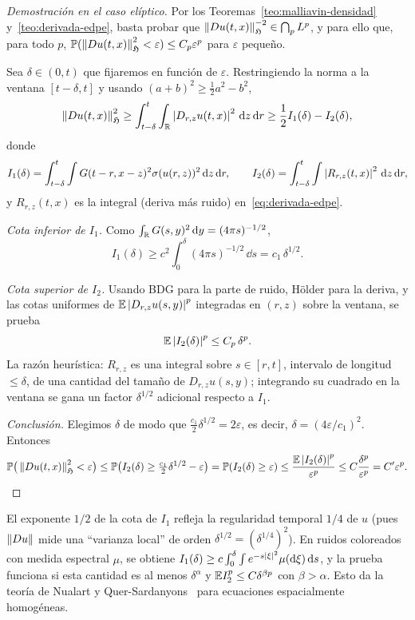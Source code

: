 \begin{proof}[Demostración en el caso elíptico]
Por los Teoremas~\ref{teo:malliavin-densidad} y~\ref{teo:derivada-edpe}, basta probar que
$\left\lVert Du(t,x)\right\rVert^{-2}_{\mathfrak{H}}\in\bigcap_pL^p$, y para ello que, para todo $p$, $\mathbb{P}(\left\lVert Du(t,x)\right\rVert^2_{\mathfrak{H}}<\varepsilon)\le C_p\varepsilon^p$ para $\varepsilon$
pequeño.

Sea $\delta\in(0,t)$ que fijaremos en función de $\varepsilon$. Restringiendo la norma a la ventana $[t-\delta,t]$ y
usando $(a+b)^2\ge\frac12a^2-b^2$,
\[
  \left\lVert Du(t,x)\right\rVert^2_{\mathfrak{H}}\ge\int_{t-\delta}^t\int_{\mathbb{R}}\left\lvert D_{r,z}u(t,x)\right\rvert^2\,\mathrm{d} z\,\mathrm{d} r\ge\frac12I_1(\delta)-I_2(\delta),
\]
donde
\[
  I_1(\delta)=\int_{t-\delta}^t\int G(t-r,x-z)^2\sigma(u(r,z))^2\,\mathrm{d} z\,\mathrm{d} r,\qquad I_2(\delta)=\int_{t-\delta}^t\int\left\lvert R_{r,z}(t,x)\right\rvert^2\,\mathrm{d} z\,\mathrm{d} r,
\]
y $R_{r,z}(t,x)$ es la integral (deriva más ruido) en~\eqref{eq:derivada-edpe}.

\emph{Cota inferior de $I_1$.} Como $\int_{\mathbb{R}} G(s,y)^2\,\mathrm{d} y=(4\pi s)^{-1/2}$,
\[
  I_1(\delta)\ge c^2\int_0^\delta(4\pi s)^{-1/2}\,\dd s=c_1\,\delta^{1/2}.
\]

\emph{Cota superior de $I_2$.} Usando BDG para la parte de ruido, Hölder para la deriva, y las cotas
uniformes de $\mathbb{E}\left\lvert D_{r,z}u(s,y)\right\rvert^p$ integradas en $(r,z)$ sobre la ventana, se prueba
\[
  \mathbb{E}\left\lvert I_2(\delta)\right\rvert^p\le C_p\,\delta^p.
\]
La razón heurística: $R_{r,z}$ es una integral sobre $s\in[r,t]$, intervalo de longitud $\le\delta$, de una
cantidad del tamaño de $D_{r,z}u(s,y)$; integrando su cuadrado en la ventana se gana un factor
$\delta^{1/2}$ adicional respecto a $I_1$.

\emph{Conclusión.} Elegimos $\delta$ de modo que $\frac{c_1}{2}\delta^{1/2}=2\varepsilon$, es decir, $\delta=(4\varepsilon/c_1)^2$. Entonces
\[
  \mathbb{P}\big(\left\lVert Du(t,x)\right\rVert^2_{\mathfrak{H}}<\varepsilon\big)\le\mathbb{P}\big(I_2(\delta)\ge\tfrac{c_1}{2}\delta^{1/2}-\varepsilon\big)=\mathbb{P}(I_2(\delta)\ge\varepsilon)\le\frac{\mathbb{E}\left\lvert I_2(\delta)\right\rvert^p}{\varepsilon^p}\le C\frac{\delta^p}{\varepsilon^p}=C'\varepsilon^p.
  \qedhere
\]
\end{proof}

\begin{observacion}
El exponente $1/2$ de la cota de $I_1$ refleja la regularidad temporal $1/4$ de $u$
(pues $\left\lVert Du\right\rVert$ mide una ``varianza local'' de orden $\delta^{1/2}=(\delta^{1/4})^2$). En ruidos coloreados con medida
espectral $\mu$, se obtiene $I_1(\delta)\ge c\int_0^\delta\int e^{-s\left\lvert \xi\right\rvert^2}\mu(\mathrm{d}\xi)\,\mathrm{d} s$, y la prueba funciona si esta cantidad es al
menos $\delta^\alpha$ y $\mathbb{E} I_2^p\le C\delta^{\beta p}$ con $\beta>\alpha$. Esto da la teoría de Nualart y Quer-Sardanyons~\cite{NualartQuerSardanyons07} para
ecuaciones espacialmente homogéneas.
\end{observacion}

